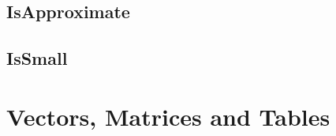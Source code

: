 %
%
%
%
%
%
%
%
%
%
%
%
%



\subsection{IsApproximate}
\lipsum[3]


\subsection{IsSmall}
\lipsum[3]




\section{Vectors, Matrices and Tables}
\label{TableProperties}

